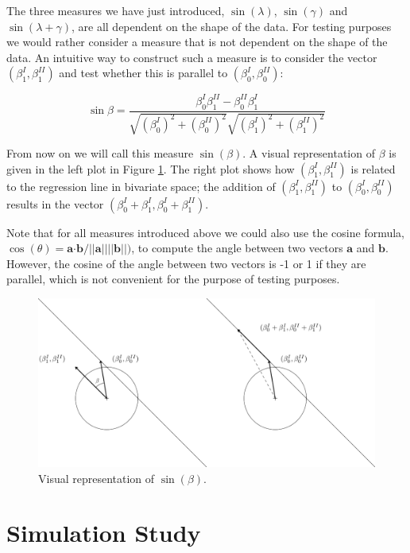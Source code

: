 \documentclass[11pt,]{article}
\begin{document}
The three measures we have just introduced, \(\sin(\lambda)\),
\(\sin(\gamma)\) and \(\sin(\lambda + \gamma)\), are all dependent on
the shape of the data. For testing purposes we would rather consider a
measure that is not dependent on the shape of the data. An intuitive way
to construct such a measure is to consider the vector
\((\beta^I_1, \beta^{II}_1)\) and test whether this is parallel to
\((\beta^I_0, \beta^{II}_0)\):

\begin{equation}
\sin{\beta} = \frac{\beta^I_0\beta^{II}_1 - \beta^{II}_0\beta^{I}_1}{\sqrt{(\beta^I_0)^2 + (\beta^{II}_0)^2}\sqrt{(\beta^I_1)^2 + (\beta^{II}_1)^2}}
\end{equation}

From now on we will call this measure \(\sin(\beta)\). A visual
representation of \(\beta\) is given in the left plot in Figure
\ref{figDet}. The right plot shows how \((\beta^I_1, \beta^{II}_1)\) is
related to the regression line in bivariate space; the addition of
\((\beta^I_1, \beta^{II}_1)\) to \((\beta^I_0, \beta^{II}_0)\) results
in the vector \((\beta^I_0 + \beta^I_1, \beta^I_0 + \beta^{II}_1)\).

Note that for all measures introduced above we could also use the cosine
formula,
\(\cos(\theta) = \boldsymbol{a} \boldsymbol{\cdot} \boldsymbol{b} / ||\boldsymbol{a}||||\boldsymbol{b}||)\),
to compute the angle between two vectors \(\boldsymbol{a}\) and
\(\boldsymbol{b}\). However, the cosine of the angle between two vectors
is -1 or 1 if they are parallel, which is not convenient for the purpose
of testing purposes.

\begin{figure}
\centering
\includegraphics{Plots/Determinant.pdf}
\caption{Visual representation of $\sin(\beta)$.} 
\label{figDet}
\end{figure}

\section{Simulation Study}\label{simulation}
\end{document}
